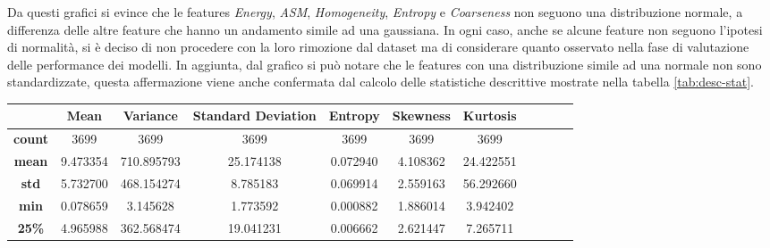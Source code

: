 Da questi grafici si evince che le features \textit{Energy}, \textit{ASM},
\textit{Homogeneity}, \textit{Entropy} e \textit{Coarseness} non seguono una
distribuzione normale, a differenza delle altre feature che hanno un andamento
simile ad una gaussiana. In ogni caso, anche se alcune feature non seguono
l'ipotesi di normalità, si è deciso di non procedere con la loro rimozione dal
dataset ma di considerare quanto osservato nella fase di valutazione delle performance
dei modelli. In aggiunta, dal grafico si può notare che le features con una
distribuzione simile ad una normale non sono standardizzate, questa affermazione
viene anche confermata dal calcolo delle statistiche descrittive mostrate nella
tabella \ref{tab:desc-stat}.
\newpage
\begin{table}[!ht]
      \begin{subtable}[h]{1\textwidth}
            \centering
            \begin{tabular}{c|c c c c c c c c c c}
                  \hline
                  \rowcolor[HTML]{EFEFEF} \cellcolor[HTML]{EFEFEF}\textbf{} & \textbf{Mean} & \textbf{Variance} & \textbf{Standard Deviation} & \cellcolor[HTML]{EFEFEF}\textbf{Entropy} & \textbf{Skewness} & \textbf{Kurtosis} \\ \hline
                  \textbf{count}                                            & 3699          & 3699              & 3699                        & 3699                                     & 3699              & 3699              \\
                  \textbf{mean}                                             & 9.473354      & 710.895793        & 25.174138                   & 0.072940                                 & 4.108362          & 24.422551         \\
                  \textbf{std}                                              & 5.732700      & 468.154274        & 8.785183                    & 0.069914                                 & 2.559163          & 56.292660         \\
                  \textbf{min}                                              & 0.078659      & 3.145628          & 1.773592                    & 0.000882                                 & 1.886014          & 3.942402          \\
                  \textbf{25\%}                                             & 4.965988      & 362.568474        & 19.041231                   & 0.006662                                 & 2.621447          & 7.265711          \\

\end{tabular}
\end{subtable}
\end{table}
